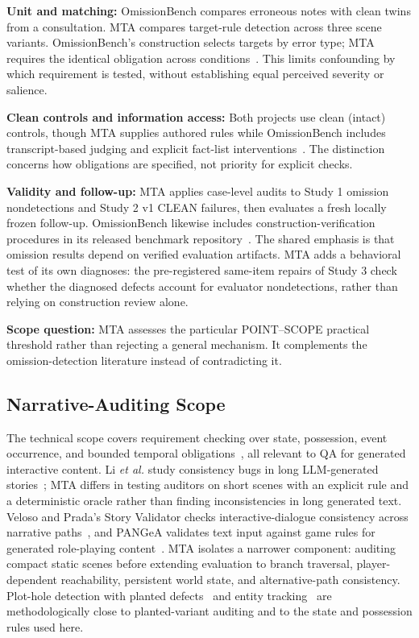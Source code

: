 \documentclass{ieeeaccess}
\begin{document}
\textbf{Unit and matching:} OmissionBench compares erroneous notes with clean twins from a consultation. MTA compares target-rule detection across three scene variants. OmissionBench's construction selects targets by error type; MTA requires the identical obligation across conditions~\cite{omissionsoftware}. This limits confounding by which requirement is tested, without establishing equal perceived severity or salience.

\textbf{Clean controls and information access:} Both projects use clean (intact) controls, though MTA supplies authored rules while OmissionBench includes transcript-based judging and explicit fact-list interventions~\cite{omissionsoftware}. The distinction concerns how obligations are specified, not priority for explicit checks.

\textbf{Validity and follow-up:} MTA applies case-level audits to Study 1 omission nondetections and Study 2 v1 CLEAN failures, then evaluates a fresh locally frozen follow-up. OmissionBench likewise includes construction-verification procedures in its released benchmark repository~\cite{omissionsoftware}. The shared emphasis is that omission results depend on verified evaluation artifacts. MTA adds a behavioral test of its own diagnoses: the pre-registered same-item repairs of Study 3 check whether the diagnosed defects account for evaluator nondetections, rather than relying on construction review alone.

\textbf{Scope question:} MTA assesses the particular POINT--SCOPE practical threshold rather than rejecting a general mechanism. It complements the omission-detection literature instead of contradicting it.

\subsection{Narrative-Auditing Scope}
The technical scope covers requirement checking over state, possession, event occurrence, and bounded temporal obligations~\cite{qiu2024temporal}, all relevant to QA for generated interactive content. Li \emph{et al.} study consistency bugs in long LLM-generated stories~\cite{li2026lost}; MTA differs in testing auditors on short scenes with an explicit rule and a deterministic oracle rather than finding inconsistencies in long generated text. Veloso and Prada's Story Validator checks interactive-dialogue consistency across narrative paths~\cite{veloso2021validator}, and PANGeA validates text input against game rules for generated role-playing content~\cite{buongiorno2024pangea}. MTA isolates a narrower component: auditing compact static scenes before extending evaluation to branch traversal, player-dependent reachability, persistent world state, and alternative-path consistency. Plot-hole detection with planted defects~\cite{ahuja2025flawed} and entity tracking~\cite{kim2023entity} are methodologically close to planted-variant auditing and to the state and possession rules used here.
\end{document}
